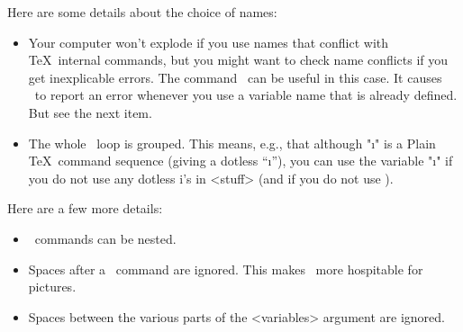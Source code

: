 Here are some details about the choice of names:
\begin{itemize}
 \item Your computer won't explode if you use names that conflict with \TeX\
internal commands, but you might want to check name conflicts if you get
inexplicable errors. The command \N\MultidoCheckNames\ can be useful in this
case. It causes \N\multido\ to report an error whenever you use a variable
name that is already defined. But see the next item.
 \item The whole \N\multido\ loop is grouped. This means, e.g., that although
"\i" is a Plain \TeX\ command sequence (giving a dotless ``\i''), you can use
the variable "\i" if you do not use any dotless i's in <stuff> (and if you do
not use \N\MultidoCheckNames).
\end{itemize}

Here are a few more details:
\begin{itemize}
\item \N\Multido\ commands can be nested.
 \item Spaces after a \N\multido\ command are ignored. This makes \N\multido\
more hospitable for pictures.
 \item Spaces between the various parts of the <variables> argument are
ignored.
\end{itemize}

